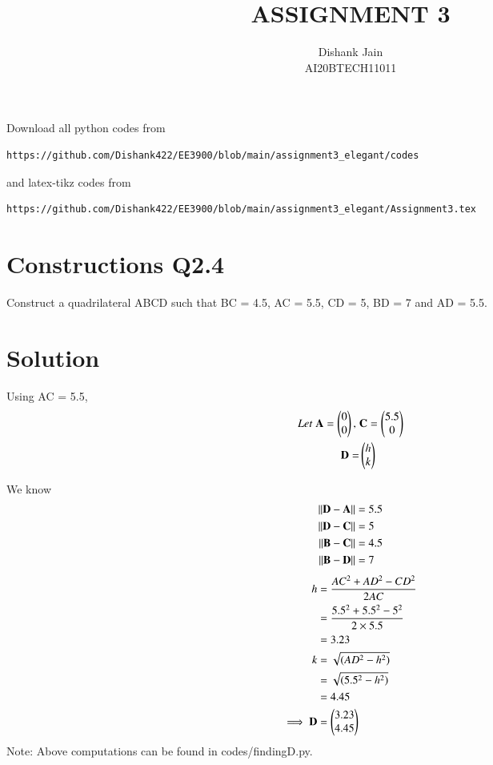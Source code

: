 \documentclass[journal,12pt,twocolumn]{IEEEtran}
\begin{document}
     \def\centbox#1{\makebox[0in]{#1}}
     \def\topbox#1{\raisebox{-\baselineskip}[0in][0in]{#1}}
     \def\midbox#1{\raisebox{-0.5\baselineskip}[0in][0in]{#1}}
\vspace{3cm}
\title{ASSIGNMENT 3}
\author{Dishank Jain \\ AI20BTECH11011}
\maketitle
\newpage
\bigskip
\renewcommand{\thefigure}{\theenumi}
\renewcommand{\thetable}{\theenumi}
Download all python codes from 
\begin{lstlisting}
https://github.com/Dishank422/EE3900/blob/main/assignment3_elegant/codes
\end{lstlisting}
%
and latex-tikz codes from 
%
\begin{lstlisting}
https://github.com/Dishank422/EE3900/blob/main/assignment3_elegant/Assignment3.tex
\end{lstlisting}
%
\section{Constructions Q2.4}
Construct a quadrilateral ABCD such that BC = 4.5, AC = 5.5, CD = 5, BD = 7  and AD = 5.5.
\section{Solution}
Using AC = 5.5,
\begin{align}
    Let\; \mathbf{A} = \begin{pmatrix}0\\0\end{pmatrix},\; &\mathbf{C} = \begin{pmatrix}5.5\\0\end{pmatrix}\\
    \mathbf{D} = &\begin{pmatrix}h\\k\end{pmatrix}
\end{align}

We know 
\begin{align}
    \lVert\mathbf{D}-\mathbf{A}\rVert &= 5.5\label{DA}\\
    \lVert\mathbf{D}-\mathbf{C}\rVert &= 5\label{DC}\\
    \lVert\mathbf{B}-\mathbf{C}\rVert &= 4.5\label{BC}\\
    \lVert\mathbf{B}-\mathbf{D}\rVert &= 7\label{BD}
\end{align}
\begin{align}
    h &= \dfrac{AC^2+AD^2-CD^2}{2AC}\\
      &= \dfrac{5.5^2+5.5^2-5^2}{2\times 5.5}\\
      &= 3.23\\
    k &= \sqrt{(AD^2-h^2)}\\
      &= \sqrt{(5.5^2-h^2)}\\
      &= 4.45\\
    \implies \mathbf{D} &= \begin{pmatrix}3.23\\4.45\end{pmatrix}
\end{align}
Note: Above computations can be found in codes/finding\textunderscore D.py.
\end{document}
